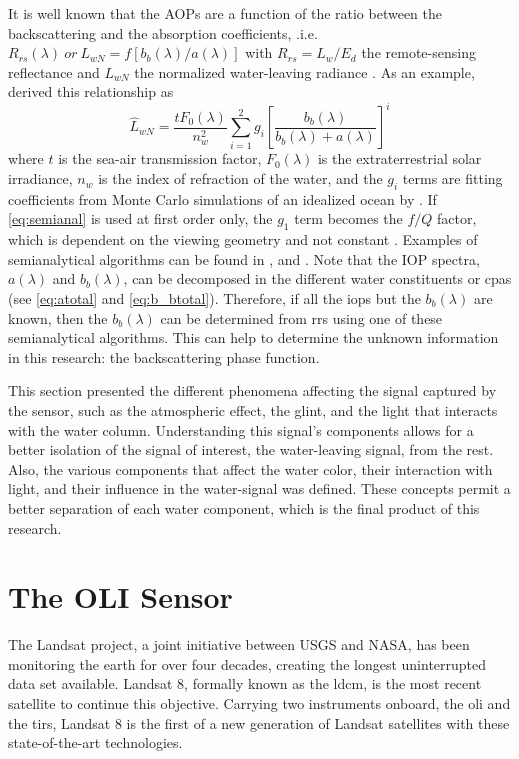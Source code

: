 It is well known that the AOPs are a function of the ratio between the backscattering and the absorption coefficients, .i.e. $R_{rs}(\lambda)~or~L_{wN} = f[b_b(\lambda)/a(\lambda)]$ with $R_{rs}=L_w/E_d$ the remote-sensing reflectance and $L_{wN}$ the normalized water-leaving radiance \citep{Morel:1977rw,Maritorena:02}. As an example, \citet{Gordon:1988qv} derived this relationship as
\begin{equation}\label{eq:semianal}
  \hat{L}_{wN} = \frac{tF_0(\lambda)}{n_w^2} \sum_{i=1}^2g_i\left[\frac{b_b(\lambda)}{b_b(\lambda)+a(\lambda)}\right]^i
\end{equation}
\noindent where $t$ is the sea-air transmission factor, $F_0(\lambda)$ is the extraterrestrial solar irradiance, $n_w$ is the index of refraction of the water, and the $g_i$ terms are fitting coefficients from Monte Carlo simulations of an idealized ocean by \citet{Gordon:1986fr}. If \autoref{eq:semianal} is used at first order only, the $g_1$ term becomes the $f/Q$ factor, which is dependent on the viewing geometry and not constant \citep{Maritorena:02}. Examples of semianalytical algorithms can be found in \citet{Lee2002_invQAA}, \citet{Lee_Du_Arnone2005} and \citet{Werdell2013_inv}. Note that the IOP spectra, $a(\lambda)$ and $b_b(\lambda)$, can be decomposed in the different water constituents or \gls{cpas} (see \autoref{eq:atotal} and \autoref{eq:b_btotal}). Therefore, if all the \gls{iops} but the $b_b(\lambda)$ are known, then the $b_b(\lambda)$ can be determined from \gls{rrs} using one of these semianalytical algorithms. This can help to determine the unknown information in this research: the backscattering phase function.

This section presented the different phenomena affecting the signal captured by the sensor, such as the atmospheric effect, the glint, and the light that interacts with the water column. Understanding this signal's components allows for a better isolation of the signal of interest, the water-leaving signal, from the rest. Also, the various components that affect the water color, their interaction with light, and their influence in the water-signal was defined. These concepts permit a better separation of each water component, which is the final product of this research.

\section{The OLI Sensor}
The Landsat project, a joint initiative between USGS and NASA, has been monitoring the earth for over four decades, creating the longest uninterrupted data set available. Landsat 8, formally known as the \gls{ldcm}, is the most recent satellite to continue this objective. Carrying two instruments onboard, the \acrfull{oli} and the \acrfull{tirs}, Landsat 8 is the first of a new generation of Landsat satellites with these state-of-the-art technologies. 

